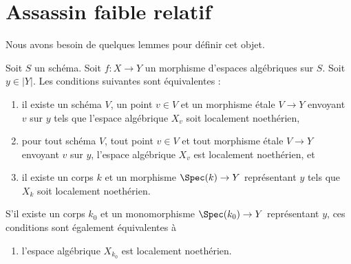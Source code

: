 \section{Assassin faible relatif}
\label{section-relative-weak-assassin}

\noindent
Nous avons besoin de quelques lemmes pour définir cet objet.

\begin{lemma}
\label{lemma-locally-noetherian-fibre}
Soit $S$ un schéma. Soit $f : X \to Y$ un morphisme d'espaces algébriques
sur $S$. Soit $y \in |Y|$. Les conditions suivantes sont équivalentes :
\begin{enumerate}
\item il existe un schéma $V$, un point $v \in V$ et un morphisme \'etale $V \to Y$
envoyant $v$ sur $y$ tels que l'espace algébrique $X_v$ soit localement noethérien,
\item pour tout schéma $V$, tout point $v \in V$ et tout morphisme \'etale $V \to Y$
envoyant $v$ sur $y$, l'espace algébrique $X_v$ est localement noethérien, et
\item il existe un corps $k$ et un morphisme $\Spec(k) \to Y$ représentant
$y$ tels que $X_k$ soit localement noethérien.
\end{enumerate}
S'il existe un corps $k_0$ et un monomorphisme $\Spec(k_0) \to Y$
représentant $y$, ces conditions sont également équivalentes à
\begin{enumerate}
\item[(4)] l'espace algébrique $X_{k_0}$ est localement noethérien.
\end{enumerate}
\end{lemma}


